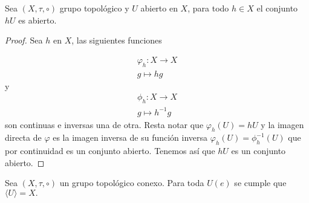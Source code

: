 	
	
\begin{lm}\label{lm:gU_es_abierto}
Sea $(X,\tau, \circ)$ grupo topológico y $U$ abierto en $X$, para todo $h \in X$ el conjunto $hU$ es abierto.
\end{lm}

\begin{proof}
Sea $h$ en $X$, las siguientes funciones

\begin{align*}
\varphi_h:X \to X \\
g \mapsto hg
\end{align*}
y 
\begin{align*}
\phi_h:X \to X \\
g \mapsto h^{-1}g
\end{align*}
 son continuas e inversas una de otra. Resta notar que $\varphi_h(U)=hU$ y  la imagen directa de $\varphi$ es la imagen inversa de su función inversa  $\varphi_h(U)=\phi_h^{-1}(U)$ que por continuidad es un conjunto abierto.  Tenemos así que $hU$ es un conjunto abierto.

\end{proof}

\begin{pr} \label{pr:vec_de_la_id_gen}
Sea $(X, \tau, \circ)$ un grupo topológico conexo. Para toda $U(e)$ se cumple que $\langle U\rangle=X.$
\end{pr}
	
